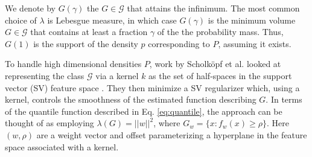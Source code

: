\documentclass[10pt, conference]{ieeeconf}      %
\begin{document}
We denote by $G(\gamma)$ the $G \in \mathcal{G}$ that attains the infinimum. The most common choice of $\lambda$ is Lebesgue measure, in which case $G(\gamma)$ is the minimum volume $G \in \mathcal{G}$ that contains at least a fraction $\gamma$ of the the probability mass. Thus, $G(1)$ is the support of the density $p$ corresponding to $P$, assuming it exists. 

To handle high dimensional densities $P$, work by Scholk{\"o}pf et al.  looked at representing the class $\mathcal{G}$ via a kernel $k$ as the set of half-spaces in the support vector (SV) feature space \cite{scholkopf2001estimating}. They then minimize a SV  regularizer which, using a kernel, controls the smoothness of the estimated function describing $G$. In terms of the quantile function described in Eq. \ref{eq:quantile}, the approach can be thought of as employing $\lambda(G) = ||w||^2$, where $G_w = \lbrace x: f_w(x) \geq \rho \rbrace$. Here $(w,\rho)$ are a weight vector and offset parameterizing a hyperplane in the feature space associated with a kernel. 
\end{document}
